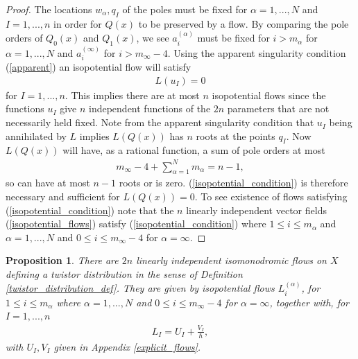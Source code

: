 \documentclass[a4paper,12pt,reqno]{amsart}
\newcounter{counter2}
\numberwithin{equation}{section}
\numberwithin{counter2}{section}
\newcounter{counter3}
\newtheorem{prop}[counter2]{Proposition}
\begin{document}
\begin{proof}
  The locations $w_\alpha,  q_I$ of the poles must be fixed for $\alpha = 1,...,N$ and $I = 1,...,n$ in order for $Q(x)$ to be preserved by a flow.   By comparing the pole orders of $Q_0(x)$ and $Q_1(x)$,  we see $a_i^{(\alpha)}$ must be fixed for $i > m_\alpha$ for $\alpha = 1,...,N$ and $a_i^{(\infty)}$ for $i > m_\infty - 4$.  
Using the apparent singularity condition (\ref{apparent}) an isopotential flow will satisfy 
\begin{align}\label{isopotential_condition}
L(u_I) = 0
\end{align}
for $I = 1,...,n$.  This implies there are at most $n$ isopotential flows since the functions $u_I$ give $n$ independent functions of the $2n$ parameters that are not necessarily held fixed.  Note from the apparent singularity condition that $u_I$ being annihilated by $L$ implies $L(Q(x))$ has $n$ roots at the points $q_I$.  Now $L(Q(x))$ will have,  as a rational function,  a sum of pole orders at most
\begin{align}
m_\infty - 4 + \sum_{\alpha=1}^{N} m_\alpha = n - 1,  
\end{align}
so can have at most $n-1$ roots or is zero.  (\ref{isopotential_condition}) is therefore necessary and sufficient for $L(Q(x)) = 0$.  To see existence of flows satisfying (\ref{isopotential_condition}) note that the $n$ linearly independent vector fields (\ref{isopotential_flows})
satisfy (\ref{isopotential_condition}) where $1 \le i \le m_\alpha$ and $\alpha = 1,...,N$ and  $0 \le i \le m_\infty - 4$ for $\alpha = \infty$.  \end{proof} 

\begin{prop}\label{explicit_flows_calc_prop}
There are $2n$ linearly independent isomonodromic flows on $X$ defining a twistor distribution in the sense of Definition \textup{ \ref{twistor_distribution_def}}.  They are given by isopotential flows $L_{i}^{(\alpha)}$,  for $1 \le i \le m_\alpha$ where $\alpha = 1,...,N$ and $0 \le i \le m_\infty - 4$ for $\alpha = \infty$,  
together with,  for $I = 1,...,n$
\begin{align}
L_I = U_I + \frac{V_I}{\hbar},
\end{align}
with $U_I,V_I$ given in Appendix \ref{explicit_flows}.  

\end{prop}
\end{document}
